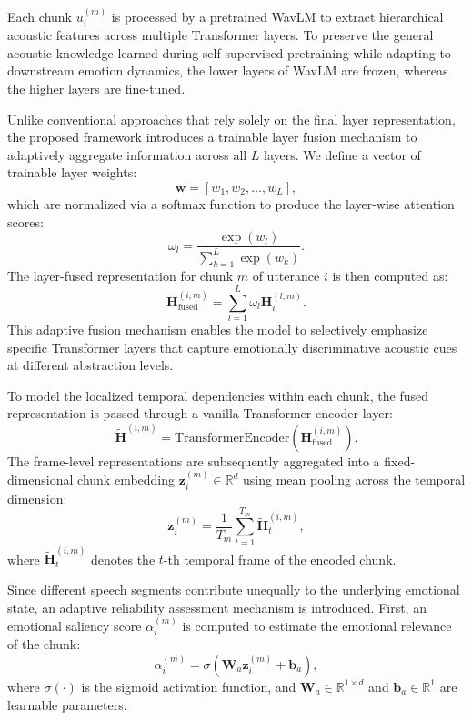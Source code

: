 Each chunk $u_i^{(m)}$ is processed by a pretrained WavLM to extract hierarchical acoustic features across multiple Transformer layers. To preserve the general acoustic knowledge learned during self-supervised pretraining while adapting to downstream emotion dynamics, the lower layers of WavLM are frozen, whereas the higher layers are fine-tuned. 

Unlike conventional approaches that rely solely on the final layer representation, the proposed framework introduces a trainable layer fusion mechanism to adaptively aggregate information across all $L$ layers. We define a vector of trainable layer weights:
\begin{equation}
	\mathbf{w} = [w_1, w_2, \dots, w_L],
\end{equation}
which are normalized via a softmax function to produce the layer-wise attention scores:
\begin{equation}
	\omega_l = \frac{\exp(w_l)}{\sum_{k=1}^{L}\exp(w_k)}.
\end{equation}
The layer-fused representation for chunk $m$ of utterance $i$ is then computed as:
\begin{equation}
	\mathbf{H}_{\text{fused}}^{(i,m)} = \sum_{l=1}^{L} \omega_l \mathbf{H}_i^{(l, m)}.
\end{equation}
This adaptive fusion mechanism enables the model to selectively emphasize specific Transformer layers that capture emotionally discriminative acoustic cues at different abstraction levels. 

To model the localized temporal dependencies within each chunk, the fused representation is passed through a vanilla Transformer encoder layer:
\begin{equation}
	\widetilde{\mathbf{H}}^{(i,m)} = \text{TransformerEncoder}(\mathbf{H}_{\text{fused}}^{(i,m)}).
\end{equation}
The frame-level representations are subsequently aggregated into a fixed-dimensional chunk embedding $\mathbf{z}_i^{(m)} \in \mathbb{R}^d$ using mean pooling across the temporal dimension:
\begin{equation}
	\mathbf{z}_i^{(m)} = \frac{1}{T_m}\sum_{t=1}^{T_m}\widetilde{\mathbf{H}}_{t}^{(i,m)},
\end{equation}
where $\widetilde{\mathbf{H}}_{t}^{(i,m)}$ denotes the $t$-th temporal frame of the encoded chunk.

Since different speech segments contribute unequally to the underlying emotional state, an adaptive reliability assessment mechanism is introduced. First, an emotional saliency score $\alpha_i^{(m)}$ is computed to estimate the emotional relevance of the chunk:
\begin{equation}
	\alpha_i^{(m)} = \sigma(\mathbf{W}_a \mathbf{z}_i^{(m)} + \mathbf{b}_a),
\end{equation}
where $\sigma(\cdot)$ is the sigmoid activation function, and $\mathbf{W}_a \in \mathbb{R}^{1 \times d}$ and $\mathbf{b}_a \in \mathbb{R}^1$ are learnable parameters.

